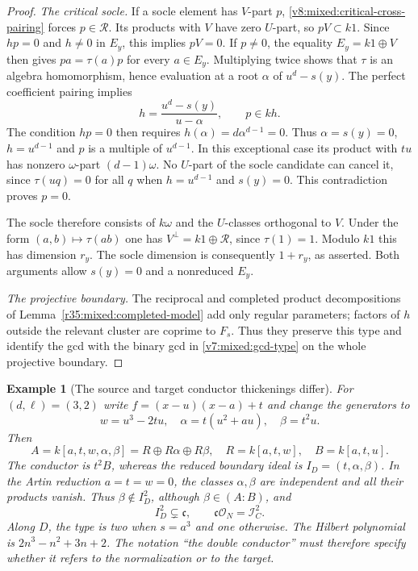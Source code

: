 \documentclass[10pt,fleqn]{article}
\numberwithin{equation}{section}
\newtheorem{example}[theorem]{Example}
\begin{document}
\begin{proof}
\textit{The critical socle.}
If a socle element has $V$-part $p$,
\eqref{v8:mixed:critical-cross-pairing} forces $p\in\mathcal R$.
Its products with $V$ have zero $U$-part, so $pV\subset k1$.
Since $hp=0$ and $h\ne0$ in $E_y$, this implies $pV=0$.
If $p\ne0$, the equality $E_y=k1\oplus V$ then gives
$pa=\tau(a)p$ for every $a\in E_y$.  Multiplying twice shows that
$\tau$ is an algebra homomorphism, hence evaluation at a root
$\alpha$ of $u^d-s(y)$.  The perfect coefficient pairing implies
\[
 h=\frac{u^d-s(y)}{u-\alpha},\qquad p\in kh.
\]
The condition $hp=0$ then requires $h(\alpha)=d\alpha^{d-1}=0$.
Thus $\alpha=s(y)=0$, $h=u^{d-1}$ and $p$ is a multiple of
$u^{d-1}$.  In this exceptional case its product with $tu$ has
nonzero $\omega$-part $(d-1)\omega$.  No $U$-part of the socle
candidate can cancel it, since $\tau(uq)=0$ for all $q$ when
$h=u^{d-1}$ and $s(y)=0$.  This contradiction proves $p=0$.

The socle therefore consists of $k\omega$ and the $U$-classes
orthogonal to $V$.  Under the form $(a,b)\mapsto\tau(ab)$ one has
$V^\perp=k1\oplus\mathcal R$, since $\tau(1)=1$.
Modulo $k1$ this has dimension $r_y$.
The socle dimension is consequently $1+r_y$, as asserted.
Both arguments allow $s(y)=0$ and a nonreduced $E_y$.

\textit{The projective boundary.}
The reciprocal and completed product decompositions of
Lemma~\ref{r35:mixed:completed-model} add only regular parameters; factors of
$h$ outside the relevant cluster are coprime to $F_s$.
Thus they preserve this type and identify the gcd with the binary gcd
in \eqref{v7:mixed:gcd-type} on the whole projective boundary.
\end{proof}

\begin{example}[The source and target conductor thickenings differ]
\label{v7:mixed:threefold}
For $(d,\ell)=(3,2)$ write $f=(x-u)(x-a)+t$ and change the generators to
\[
 w=u^3-2tu,\quad \alpha=t(u^2+au),\quad\beta=t^2u.
\]
Then
\[
 A=k[a,t,w,\alpha,\beta]
   =R\oplus R\alpha\oplus R\beta,\quad R=k[a,t,w],\quad B=k[a,t,u].
\]
The conductor is $t^2B$, whereas the reduced boundary ideal is
$I_D=(t,\alpha,\beta)$.  In the Artin reduction $a=t=w=0$, the classes
$\alpha,\beta$ are independent and all their products vanish.
Thus $\beta\notin I_D^2$, although $\beta\in(A:B)$, and
\[
 I_D^2\subsetneq\mathfrak c,\qquad
 \mathfrak c\mathcal O_N=\mathcal I_C^2.
\]
Along $D$, the type is two when $s=a^3$ and one otherwise.  The Hilbert
polynomial is $2n^3-n^2+3n+2$.
The notation ``the double conductor'' must therefore specify whether it
refers to the normalization or to the target.
\end{example}
\end{document}
